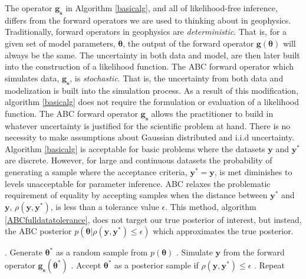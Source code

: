 The operator $\bm{g_s}$ in Algorithm \ref{basicalg}, and all of likelihood-free inference, differs from the forward operators we are used to thinking about in geophysics. Traditionally, forward operators in geophysics are \textit{deterministic}. That is, for a given set of model parameters, $\bm{\theta}$, the output of the forward operator $\bm{g}(\bm{\theta})$ will always be the same. The uncertainty in both data and model, are then later built into the construction of a likelihood function. The ABC forward operator which simulates data, $\bm{g_s}$, is \textit{stochastic}. That is, the uncertainty from both data and modelization is built into the simulation process. As a result of this modification, algorithm \ref{basicalg} does not require the formulation or evaluation of a likelihood function. The ABC forward operator $\bm{g_s}$ allows the practitioner to build in whatever uncertainty is justified for the scientific problem at hand. There is no necessity to make assumptions about Gaussian distributed and i.i.d uncertainty. \\

Algorithm \ref{basicalg} is acceptable for basic problems where the datasets $\bm{y}$ and $\bm{y^*}$ are discrete. However, for large and continuous datasets the probability of generating a sample where the acceptance criteria, $\bm{y^*} = \bm{y}$, is met diminishes to levels unacceptable for parameter inference. ABC relaxes the problematic requirement of equality by accepting samples when the distance between $\bm{y^*}$ and $\bm{y}$, $\rho(\bm{y},\bm{y^*})$, is less than a tolerance value $\epsilon$. This method, algorithm \ref{ABCfulldatatolerance}, does not target our true posterior of interest, but instead, the ABC posterior $p(\bm{\theta}|\rho(\bm{y},\bm{y^*})\leq\epsilon)$ which approximates the true posterior. 

\begin{algorithm}[H]
	\caption{ }
	\begin{algorithmic}
		. Generate $\bm{\theta^*}$ as a random sample from $p(\bm{\theta})$		
		. Simulate $\bm{y}$ from the forward operator $\bm{g_s}(\bm{\theta^*})$		
		. Accept $\bm{\theta^*}$ as a posterior sample if $\rho(\bm{y},\bm{y^*})\leq\epsilon$		
		. Repeat
	\end{algorithmic}
	\label{ABCfulldatatolerance}
\end{algorithm}

